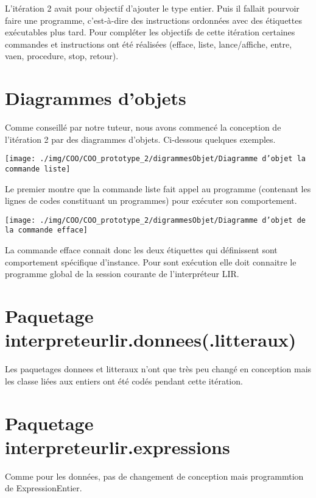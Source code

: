 \par L'itération 2 avait pour objectif d'ajouter le type entier. Puis il fallait pourvoir faire une programme, c'est-à-dire des instructions ordonnées avec des étiquettes exécutables plus tard. Pour compléter les objectifs de cette itération certaines commandes et instructions ont été réalisées (efface, liste, lance/affiche, entre, vaen, procedure, stop, retour).

\section{Diagrammes d'objets}
Comme conseillé par notre tuteur, nous avons commencé la conception de l'itération 2 par des diagrammes d'objets. Ci-dessous quelques exemples.
\par
\begin{center}\texttt{[image: ./img/COO/COO\_prototype\_2/digrammesObjet/Diagramme d'objet la commande liste]}
\end{center}
\par Le premier montre que la commande liste fait appel au programme (contenant les lignes de codes constituant un programmes) pour exécuter son comportement.
\par
\begin{center}\texttt{[image: ./img/COO/COO\_prototype\_2/digrammesObjet/Diagramme d'objet de la commande efface]}\end{center}
\par La commande efface connait donc les deux étiquettes qui définissent sont comportement spécifique d'instance. Pour sont exécution elle doit connaitre le programme global de la session courante de l'interpréteur LIR.

\section{Paquetage interpreteurlir.donnees(.litteraux)}
\par Les paquetages donnees et litteraux n'ont que très peu changé en conception mais les classe liées aux entiers ont été codés pendant cette itération.

\section{Paquetage interpreteurlir.expressions}
\par Comme pour les données, pas de changement de conception mais programmtion de ExpressionEntier.

